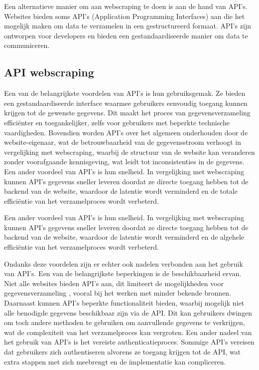 Een alternatieve manier om aan webscraping te doen is aan de hand van API's. Websites bieden soms API's (Application Programming Interfaces) aan die het mogelijk maken om data te verzamelen in een gestructureerd formaat\autocite{Ayushi2021}. API's zijn ontworpen voor developers en bieden een gestandaardiseerde manier om data te communiceren.

\subsection{API webscraping}

Een van de belangrijkste voordelen van API's is hun gebruiksgemak. Ze bieden een gestandaardiseerde interface waarmee gebruikers eenvoudig toegang kunnen krijgen tot de gewenste gegevens. Dit maakt het proces van gegevensverzameling efficiënter en toegankelijker, zelfs voor gebruikers met beperkte technische vaardigheden. Bovendien worden API's over het algemeen onderhouden door de website-eigenaar, wat de betrouwbaarheid van de gegevensstroom verhoogt in vergelijking met webscraping, waarbij de structuur van de website kan veranderen zonder voorafgaande kennisgeving, wat leidt tot inconsistenties in de gegevens. Een ander voordeel van API's is hun snelheid. In vergelijking met webscraping kunnen API's gegevens sneller leveren doordat ze directe toegang hebben tot de backend van de website, waardoor de latentie wordt verminderd en de totale efficiëntie van het verzamelproces wordt verbeterd.

Een ander voordeel van API's is hun snelheid. In vergelijking met webscraping kunnen API's gegevens sneller leveren doordat ze directe toegang hebben tot de backend van de website, waardoor de latentie wordt verminderd en de algehele efficiëntie van het verzamelproces wordt verbeterd.

\vspace{5mm} %

Ondanks deze voordelen zijn er echter ook nadelen verbonden aan het gebruik van API's. Een van de belangrijkste beperkingen is de beschikbaarheid ervan. Niet alle websites bieden API's aan, dit limiteert de mogelijkheden voor gegevensverzameling , vooral bij het werken met minder bekende bronnen.
Daarnaast kunnen API's beperkte functionaliteit bieden, waarbij mogelijk niet alle benodigde gegevens beschikbaar zijn via de API. Dit kan gebruikers dwingen om toch andere methoden te gebruiken om aanvullende gegevens te verkrijgen, wat de complexiteit van het verzamelproces kan vergroten.
Een ander nadeel van het gebruik van API's is het vereiste authenticatieproces. Sommige API's vereisen dat gebruikers zich authentiseren alvorens ze toegang krijgen tot de API, wat extra stappen met zich meebrengt en de implementatie kan compliceren.

